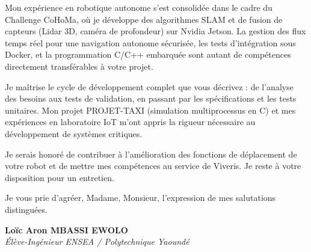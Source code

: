 \documentclass[a4paper,11pt]{article}
\begin{document}
Mon expérience en robotique autonome s'est consolidée dans le cadre du Challenge CoHoMa, où je développe des algorithmes SLAM et de fusion de capteurs (Lidar 3D, caméra de profondeur) sur Nvidia Jetson. La gestion des flux temps réel pour une navigation autonome sécurisée, les tests d'intégration sous Docker, et la programmation C/C++ embarquée sont autant de compétences directement transférables à votre projet.

Je maîtrise le cycle de développement complet que vous décrivez : de l'analyse des besoins aux tests de validation, en passant par les spécifications et les tests unitaires. Mon projet PROJET-TAXI (simulation multiprocessus en C) et mes expériences en laboratoire IoT m'ont appris la rigueur nécessaire au développement de systèmes critiques.

Je serais honoré de contribuer à l'amélioration des fonctions de déplacement de votre robot et de mettre mes compétences au service de Viveris. Je reste à votre disposition pour un entretien.

Je vous prie d'agréer, Madame, Monsieur, l'expression de mes salutations distinguées.

\vspace{0.8cm}

\textbf{Loïc Aron MBASSI EWOLO}\\
\textit{Élève-Ingénieur ENSEA / Polytechnique Yaoundé}
\end{document}
